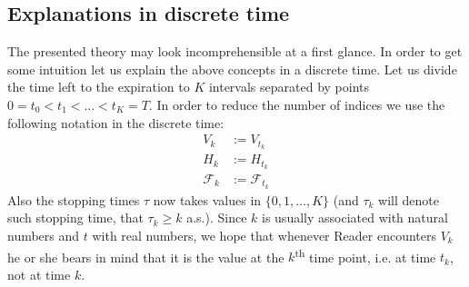\documentclass[a4paper,11pt, twoside]{book}
\theoremstyle{definition}
\theoremstyle{remark}
\begin{document}
\subsection{Explanations in discrete time}
The presented theory may look incomprehensible at a first glance. In order to get some intuition let us explain the above concepts in a discrete time. Let us divide the time left to the expiration to $K$ intervals separated by points $0 = t_0 < t_1 < \ldots < t_K = T$. In order to reduce the number of indices we use the following notation in the discrete time:
\begin{align*}
 V_k &:= V_{t_k} \\
 H_k &:= H_{t_k} \\
 \mathcal{F}_k &:= \mathcal{F}_{t_k}
\end{align*}
Also the stopping times $\tau$ now takes values in $\{0, 1, \ldots, K\}$ (and $\tau_k$ will denote such stopping time, that $\tau_k \geq k$ a.s.).
Since $k$ is usually associated with natural numbers and $t$ with real numbers, we hope that whenever Reader encounters $V_k$ he or she bears in mind that it is the value at the $k$\textsuperscript{th} time point, i.e. at time $t_k$, not at time $k$.
\end{document}
